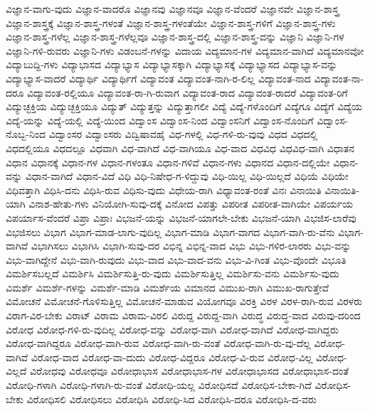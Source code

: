 {ವಿಜ್ಞಾನ-ವಾಗು-ವುದು
ವಿಜ್ಞಾನ-ವಾದರೊ
ವಿಜ್ಞಾನವು
ವಿಜ್ಞಾನವೂ
ವಿಜ್ಞಾನ-ವೆಂದರೆ
ವಿಜ್ಞಾನವೇ
ವಿಜ್ಞಾನ-ಶಾಸ್ತ್ರ
ವಿಜ್ಞಾನ-ಶಾಸ್ತ್ರಕ್ಕೆ
ವಿಜ್ಞಾನ-ಶಾಸ್ತ್ರ-ಗಳಂತೆ
ವಿಜ್ಞಾನ-ಶಾಸ್ತ್ರ-ಗಳಂತೆಯೇ
ವಿಜ್ಞಾನ-ಶಾಸ್ತ್ರ-ಗಳಿಗೆ
ವಿಜ್ಞಾನ-ಶಾಸ್ತ್ರ-ಗಳು
ವಿಜ್ಞಾನ-ಶಾಸ್ತ್ರ-ಗಳೆಲ್ಲ
ವಿಜ್ಞಾನ-ಶಾಸ್ತ್ರ-ಗಳೆಲ್ಲವೂ
ವಿಜ್ಞಾನ-ಶಾಸ್ತ್ರ-ದಲ್ಲಿ
ವಿಜ್ಞಾನ-ಶಾಸ್ತ್ರ-ವನ್ನು
ವಿಜ್ಞಾನಿ
ವಿಜ್ಞಾನಿ-ಗಳ
ವಿಜ್ಞಾನಿ-ಗಳಿ-ರುವರು
ವಿಜ್ಞಾನಿ-ಗಳು
ವಿಡಂಬನೆ-ಗಳನ್ನು
ವಿದಾಯ
ವಿದ್ಯಮಾನ-ಗಳ
ವಿದ್ಯಮಾನ-ವಾಗಿದೆ
ವಿದ್ಯಮಾನವೋ
ವಿದ್ಯಾಬುದ್ದಿ-ಗಳು
ವಿದ್ಯಾಭಾಸದ
ವಿದ್ಯಾಭ್ಯಾಸ
ವಿದ್ಯಾಭ್ಯಾಸಕ್ಕಾಗಿ
ವಿದ್ಯಾಭ್ಯಾಸಕ್ಕೆ
ವಿದ್ಯಾಭ್ಯಾಸದ
ವಿದ್ಯಾಭ್ಯಾಸ-ವನ್ನು
ವಿದ್ಯಾಭ್ಯಾಸ-ವಾದರೆ
ವಿದ್ಯಾರ್ಥಿ
ವಿದ್ಯಾರ್ಥಿಗೆ
ವಿದ್ಯಾವಂತ
ವಿದ್ಯಾವಂತ-ನಾಗಿ-ರ-ಲಿಲ್ಲ
ವಿದ್ಯಾವಂತ-ನಾದ
ವಿದ್ಯಾವಂತ-ನಾ-ದರೂ
ವಿದ್ಯಾವಂತ-ರಲ್ಲಿಯೂ
ವಿದ್ಯಾವಂತ-ರಾ-ಗಿ-ರುವಾಗ
ವಿದ್ಯಾವಂತ-ರಾದ
ವಿದ್ಯಾವಂತ-ರಾದರೆ
ವಿದ್ಯಾವಂತ-ರಿಗೆ
ವಿದ್ಯುಚ್ಛಕ್ತಿಯ
ವಿದ್ಯುಚ್ಛಕ್ತಿಯೂ
ವಿದ್ಯುತ್
ವಿದ್ಯುತ್ತನ್ನು
ವಿದ್ಯುತ್ತಾಗಲೀ
ವಿದ್ಯೆ
ವಿದ್ಯೆ-ಗಳೊಂದಿಗೆ
ವಿದ್ಯೆಗೂ
ವಿದ್ಯೆಗೆ
ವಿದ್ಯೆಯ
ವಿದ್ಯೆ-ಯನ್ನು
ವಿದ್ಯೆ-ಯಲ್ಲಿ
ವಿದ್ಯೆ-ಯಿಂದ
ವಿದ್ವಾಂಸ
ವಿದ್ವಾಂಸ-ನಿಂದ
ವಿದ್ವಾಂಸನಿಗೆ
ವಿದ್ವಾಂಸ-ನೊಂದಿಗೆ
ವಿದ್ವಾಂಸ-ನೊಬ್ಬ-ನಿಂದ
ವಿದ್ವಾಂಸರ
ವಿದ್ವಾಂಸರು
ವಿದ್ವಿಷಾವಹೈ
ವಿಧ-ಗಳಲ್ಲಿ
ವಿಧ-ಗಳಿ-ರು-ವುವು
ವಿಧದ
ವಿಧದಲ್ಲಿ
ವಿಧದಲ್ಲಿಯೂ
ವಿಧದಲ್ಲೂ
ವಿಧವಾಗಿ
ವಿಧ-ವಾಗಿದೆ
ವಿಧ-ವಾಗಿಯೂ
ವಿಧ-ವಾದ
ವಿಧವಿಧ
ವಿಧವಿಧ-ವಾಗಿ
ವಿಧಾತನ
ವಿಧಾನ
ವಿಧಾನಕ್ಕೆ
ವಿಧಾನ-ಗಳ
ವಿಧಾನ-ಗಳಂತೂ
ವಿಧಾನ-ಗಳಿವೆ
ವಿಧಾನ-ಗಳು
ವಿಧಾನದ
ವಿಧಾನ-ದಲ್ಲಿಯೇ
ವಿಧಾನ-ವನ್ನು
ವಿಧಾನ-ವಾಗಿದೆ
ವಿಧಾನ-ವಿದೆ
ವಿಧಿ
ವಿಧಿ-ನಿಷೇಧ-ಗ-ಳಿದ್ದುವು
ವಿಧಿ-ಯಿಲ್ಲ
ವಿಧಿ-ಯಿಲ್ಲದೆ
ವಿಧಿಯೆ
ವಿಧಿಯೇ
ವಿಧಿವತ್ತಾಗಿ
ವಿಧಿಸಿ-ದನು
ವಿಧಿಸಿ-ರುವ
ವಿಧಿಸು-ವುದು
ವಿಧೇಯ-ರಾಗಿ
ವಿಧ್ಯಾವಂತ-ರಂತೆ
ವಿನಃ
ವಿನಾಯಿತಿ
ವಿನಾಯಿತಿ-ಯಾಗಿ
ವಿನಾಶ-ಹೇತು-ಗಳು
ವಿನಿಯೋಗಿ-ಸುವು-ದಕ್ಕೆ
ವಿನೋದ
ವಿಪತ್ತು
ವಿಪರೀತ
ವಿಪರೀತ-ವಾಗಿಯೇ
ವಿಪರ್ಯಯ
ವಿಪರ್ಯಾಸ-ವೆಂದರೆ
ವಿಪ್ರಾ
ವಿಪ್ರಾಃ
ವಿಭಜನೆ-ಯನ್ನು
ವಿಭಜನೆ-ಯಾಗಲೇ-ಬೇಕು
ವಿಭಜನೆ-ಯಾಗಿ
ವಿಭಜಿಸ-ಲಾರೆವು
ವಿಭಜಿಸಲು
ವಿಭಾಗ
ವಿಭಾಗ-ಮಾಡ-ಲಾಗು-ವುದಿಲ್ಲ
ವಿಭಾಗ-ಮಾಡಿ
ವಿಭಾಗ-ವಾಗದ
ವಿಭಾಗ-ವಾಗಿ-ರು-ವೆನು
ವಿಭಾಗ-ವಾಗಿವೆ
ವಿಭಾಗಿಸಲು
ವಿಭಾಗಿಸಿ
ವಿಭಾಗಿ-ಸುವು-ದರ
ವಿಭಿನ್ನ
ವಿಭಿನ್ನ-ವಾದ
ವಿಭು
ವಿಭು-ಗಳಿರ-ಲಾರರು
ವಿಭು-ವನ್ನು
ವಿಭು-ವಾಗಿದ್ದೇನೆ
ವಿಭು-ವಾಗಿ-ರುವುದು
ವಿಭು-ವಾದ
ವಿಭು-ವಾದ-ವನು
ವಿಭು-ವಿ-ಗಿಂತ
ವಿಭು-ವೊಂದೇ
ವಿಭೂತಿ
ವಿಮರ್ಶಿಸಬಲ್ಲದೆ
ವಿಮರ್ಶಿಸಿ
ವಿಮರ್ಶಿಸುತ್ತಿ-ರು-ವುದು
ವಿಮರ್ಶಿಸುತ್ತಿಲ್ಲ
ವಿಮರ್ಶಿಸು-ವನು
ವಿಮರ್ಶಿಸು-ವುದು
ವಿಮರ್ಶೆ
ವಿಮರ್ಶೆ-ಗಳನ್ನು
ವಿಮರ್ಶೆ-ಮಾಡಿ
ವಿಮರ್ಶೆಯ
ವಿಮಾನದ
ವಿಮುಖ-ರಾಗಿ
ವಿಮುಖ-ರಾಗುತ್ತೇವೆ
ವಿಮೋಚನೆ
ವಿಮೋಚನೆ-ಗೊಳಿಸುತ್ತಿಲ್ಲ
ವಿಮೋಚನೆ-ಮಾಡುವ
ವಿಯೋಗವೂ
ವಿರಕ್ತಿ
ವಿರಳ
ವಿರಳ-ರಾಗಿ-ರುವ
ವಿರಳರು
ವಿರಾಗ-ವಿರ-ಬೇಕು
ವಿರಾಟ್
ವಿರಾಮ
ವಿರಾಮ-ವಿರಲಿ
ವಿರುದ್ದ
ವಿರುದ್ದ-ವಾಗಿ
ವಿರುದ್ಧ
ವಿರುದ್ಧ-ವಾದ
ವಿರುವು-ದರಿಂದ
ವಿರೋಧ
ವಿರೋಧ-ಗಳಿ-ರು-ವುದಿಲ್ಲ
ವಿರೋಧ-ವನ್ನು
ವಿರೋಧ-ವಾಗಿ
ವಿರೋಧ-ವಾಗಿದೆ
ವಿರೋಧ-ವಾಗಿದ್ದರು
ವಿರೋಧ-ವಾಗಿದ್ದರೂ
ವಿರೋಧ-ವಾಗಿ-ರುವ
ವಿರೋಧ-ವಾಗಿ-ರು-ವಂತೆ
ವಿರೋಧ-ವಾಗಿ-ರು-ವು-ದೆಲ್ಲ
ವಿರೋಧ-ವಾಗಿವೆ
ವಿರೋಧ-ವಾದ
ವಿರೋಧ-ವಾ-ದುದು
ವಿರೋಧ-ವಿದ್ದರೂ
ವಿರೋಧ-ವಿ-ರುವ
ವಿರೋಧ-ವಿಲ್ಲ
ವಿರೋಧ-ವಿಲ್ಲದೆ
ವಿರೋಧವು
ವಿರೋಧವೂ
ವಿರೋಧಾಭಾಸ
ವಿರೋಧಾಭಾಸ-ಗಳ
ವಿರೋಧಾಭಾಸದ
ವಿರೋಧಾಭಾಸ-ದಂತೆ
ವಿರೋಧಿ-ಗಳಾಗಿ
ವಿರೋಧಿ-ಗಳಾಗಿ-ರು-ವಂತೆ
ವಿರೋಧಿ-ಯಲ್ಲ
ವಿರೋಧಿಸದೆ
ವಿರೋಧಿಸ-ಬೇಕಾ-ಗಿದೆ
ವಿರೋಧಿಸ-ಬೇಕು
ವಿರೋಧಿಸಲಿ
ವಿರೋಧಿಸಲು
ವಿರೋಧಿಸಿ
ವಿರೋಧಿ-ಸಿದ
ವಿರೋಧಿಸಿ-ದರೂ
ವಿರೋಧಿಸಿ-ದ-ವರು
}
